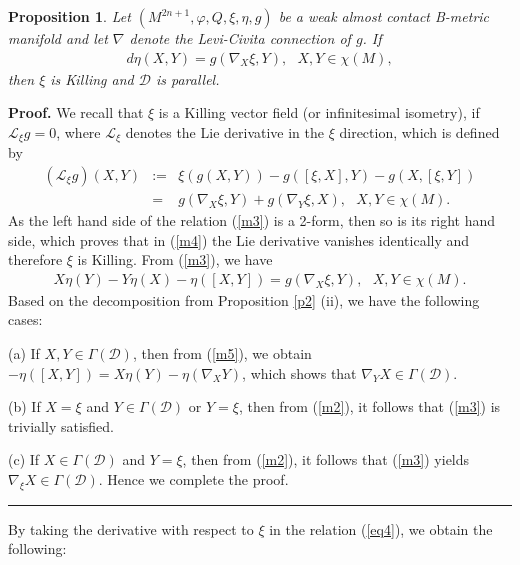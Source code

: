 \documentclass{article}
\newtheorem{proposition}[theorem]{Proposition}
\newenvironment{proof}[1][Proof]{\noindent\textbf{#1.} }{\ \rule{0.5em}{0.5em}}
\begin{document}
\begin{proposition}
Let $(M^{2n+1},\varphi,Q,\xi,\eta, g)$ be a weak almost contact B-metric manifold and let $\nabla$ denote the Levi-Civita connection of $g$. If 
\begin{eqnarray}
	d\eta(X,Y)=g(\nabla_X\xi,Y), \ \ \ X,Y\in\chi(M), \label{m3}
\end{eqnarray} 
	 then $\xi$ is Killing and $\mathcal{D}$ is parallel.
\end{proposition}

\begin{proof}
	We recall that $\xi$ is a Killing vector field (or infinitesimal isometry), if $\mathcal{L}_{\xi}g=0$, where $\mathcal{L}_{\xi}$ denotes the Lie derivative in the $\xi$ direction, which is defined by 
	\begin{eqnarray}
		(\mathcal{L}_{\xi}g)(X,Y)&:=&\xi(g(X,Y))-g([\xi,X],Y)-g(X,[\xi,Y])\label{m4}\\
		&=&g(\nabla_X\xi,Y)+g(\nabla_Y\xi,X), \ \ \ X,Y\in\chi(M).\nonumber
	\end{eqnarray}	
As the left hand side of the relation (\ref{m3}) is a 2-form, then so is its right hand side, which proves that in (\ref{m4}) the Lie derivative vanishes identically and therefore $\xi$ is Killing. From (\ref{m3}), we have 
\begin{eqnarray}
	X\eta(Y)-Y\eta(X)-\eta([X,Y])=g(\nabla_X\xi,Y), \ \ \ X,Y\in\chi(M). \label{m5}
\end{eqnarray}
Based on the decomposition from Proposition \ref{p2} (ii), we have the following cases:  \medskip

\noindent (a) If $X,Y\in\Gamma(\mathcal{D})$, then from (\ref{m5}), we obtain  $-\eta([X,Y])=X\eta(Y)-\eta(\nabla_XY)$, which shows that $\nabla_YX\in\Gamma(\mathcal{D})$. \medskip

\noindent (b) If $X=\xi$ and $Y\in\Gamma(\mathcal{D})$ or $Y=\xi$, then from (\ref{m2}), it follows that (\ref{m3}) is trivially satisfied.\medskip

\noindent (c) If $X\in\Gamma(\mathcal{D})$ and $Y=\xi$, then from (\ref{m2}), it follows that (\ref{m3}) yields $\nabla_{\xi}X\in\Gamma(\mathcal{D})$. Hence we complete the proof.
\end{proof}\medskip

By taking the derivative with respect to $\xi$ in the relation (\ref{eq4}), we obtain the following:
\end{document}
